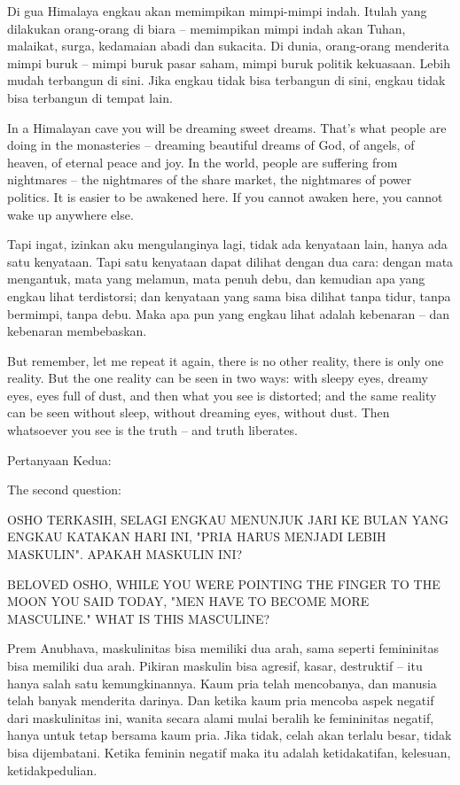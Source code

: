 \bahasa
Di gua Himalaya engkau akan memimpikan mimpi-mimpi indah. Itulah yang dilakukan orang-orang di biara -- memimpikan mimpi indah akan Tuhan, malaikat, surga, kedamaian abadi dan sukacita. Di dunia, orang-orang menderita mimpi buruk -- mimpi buruk pasar saham, mimpi buruk politik kekuasaan. Lebih mudah terbangun di sini. Jika engkau tidak bisa terbangun di sini, engkau tidak bisa terbangun di tempat lain.

\english
In a Himalayan cave you will be dreaming sweet dreams. That's what people are doing in the monasteries -- dreaming beautiful dreams of God, of angels, of heaven, of eternal peace and joy. In the world, people are suffering from nightmares -- the nightmares of the share market, the nightmares of power politics. It is easier to be awakened here. If you cannot awaken here, you cannot wake up anywhere else.

\bahasa
Tapi ingat, izinkan aku mengulanginya lagi, tidak ada kenyataan lain, hanya ada satu kenyataan. Tapi satu kenyataan dapat dilihat dengan dua cara: dengan mata mengantuk, mata yang melamun, mata penuh debu, dan kemudian apa yang engkau lihat terdistorsi; dan kenyataan yang sama bisa dilihat tanpa tidur, tanpa bermimpi, tanpa debu. Maka apa pun yang engkau lihat adalah kebenaran -- dan kebenaran membebaskan.

\english
But remember, let me repeat it again, there is no other reality, there is only one reality. But the one reality can be seen in two ways: with sleepy eyes, dreamy eyes, eyes full of dust, and then what you see is distorted; and the same reality can be seen without sleep, without dreaming eyes, without dust. Then whatsoever you see is the truth -- and truth liberates.

\bahasa
Pertanyaan Kedua:

\english
The second question:

\bahasa
OSHO TERKASIH,
SELAGI ENGKAU MENUNJUK JARI KE BULAN YANG ENGKAU KATAKAN HARI INI, "PRIA HARUS MENJADI LEBIH MASKULIN". APAKAH MASKULIN INI?

\english
BELOVED OSHO,
WHILE YOU WERE POINTING THE FINGER TO THE MOON YOU SAID TODAY, "MEN HAVE TO BECOME MORE MASCULINE." WHAT IS THIS MASCULINE?

\bahasa
Prem Anubhava, maskulinitas bisa memiliki dua arah, sama seperti femininitas bisa memiliki dua arah. Pikiran maskulin bisa agresif, kasar, destruktif -- itu hanya salah satu kemungkinannya. Kaum pria telah mencobanya, dan manusia telah banyak menderita darinya. Dan ketika kaum pria mencoba aspek negatif dari maskulinitas ini, wanita secara alami mulai beralih ke femininitas negatif, hanya untuk tetap bersama kaum pria. Jika tidak, celah akan terlalu besar, tidak bisa dijembatani. Ketika feminin negatif maka itu adalah ketidakatifan, kelesuan, ketidakpedulian.

